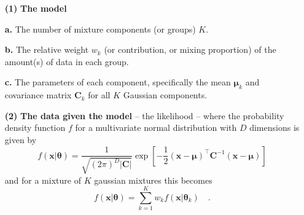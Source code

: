 \documentclass{elsarticle}
\newcommand{\vect}[1]{\boldsymbol{\mathbf{#1}}}
\renewcommand{\vec}[1]{\vect{#1}}
\def\veccov{\vect{C}}
\def\vecmean{\vect{\mu}}
\def\weight{w}
\begin{document}
\begin{itemize}
    \item[\textbf{(1)}] \textbf{The model}
    \item[\textbf{a.}]  The number of mixture components (or groups) $K$.
    \item[\textbf{b.}]  The relative weight $w_k$ (or contribution, or mixing 
                        proportion) of the amount(s) of data in each group. 


    \item[\textbf{c.}]  The parameters of each component, specifically the mean
                        $\vecmean_k$ and covariance matrix $\veccov_k$ for all 
                        $K$ Gaussian components.

    \item[\textbf{(2)}] \textbf{The data given the model} -- the likelihood --
                        where the probability density function $f$ for a
                        multivariate normal distribution with $D$ dimensions
                        is given by
                        \begin{equation}
                            f(\vec{x}|\vec{\theta}) = \frac{1}{\sqrt{(2\pi)^{D}|\veccov|}}\exp{\left[-\frac{1}{2}(\vec{x} - \vecmean)^\intercal\veccov^{-1}(\vec{x}-\vecmean)\right]}
                        \end{equation}
                        \noindent{}and for a mixture of $K$ gaussian mixtures
                        this becomes
                        \begin{equation}
                            f(\vec{x}|\vec{\theta}) = \sum_{k=1}^{K}\weight_{k}f(\vec{x}|\vec{\theta}_{k}) \quad .
                        \end{equation}

\end{itemize}
\end{document}
